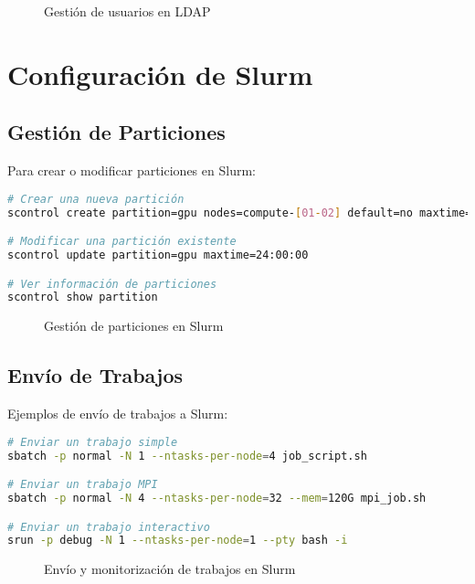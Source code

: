 \documentclass[12pt,a4paper]{report}
\begin{document}
\begin{figure}[H]
\centering
\caption{Gestión de usuarios en LDAP}
\label{fig:ldap_users}
\end{figure}

\section{Configuración de Slurm}

\subsection{Gestión de Particiones}

Para crear o modificar particiones en Slurm:

\begin{lstlisting}[language=bash]
# Crear una nueva partición
scontrol create partition=gpu nodes=compute-[01-02] default=no maxtime=12:00:00 state=up

# Modificar una partición existente
scontrol update partition=gpu maxtime=24:00:00

# Ver información de particiones
scontrol show partition
\end{lstlisting}

\begin{figure}[H]
\centering
\caption{Gestión de particiones en Slurm}
\label{fig:slurm_partitions}
\end{figure}

\subsection{Envío de Trabajos}

Ejemplos de envío de trabajos a Slurm:

\begin{lstlisting}[language=bash]
# Enviar un trabajo simple
sbatch -p normal -N 1 --ntasks-per-node=4 job_script.sh

# Enviar un trabajo MPI
sbatch -p normal -N 4 --ntasks-per-node=32 --mem=120G mpi_job.sh

# Enviar un trabajo interactivo
srun -p debug -N 1 --ntasks-per-node=1 --pty bash -i
\end{lstlisting}

\begin{figure}[H]
\centering
\caption{Envío y monitorización de trabajos en Slurm}
\label{fig:slurm_jobs}
\end{figure}
\end{document}

